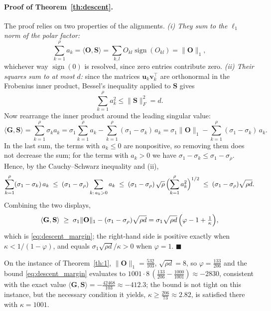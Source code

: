 \documentclass{article}
\begin{document}
\paragraph{Proof of Theorem~\ref{th:descent}.} The proof relies on two properties of the alignments.
\emph{(i) They sum to the $\ell_1$ norm of the polar factor:}
\begin{equation}
\sum_{k=1}^{\rho} a_k = \langle \mathbf{O}, \mathbf{S}\rangle = \sum_{k,l} O_{kl}\operatorname{sign}(O_{kl}) = \|\mathbf{O}\|_1,
\end{equation}
whichever way $\operatorname{sign}(0)$ is resolved, since zero entries contribute zero.
\emph{(ii) Their squares sum to at most $d$:} since the matrices $\mathbf{u}_k\mathbf{v}_k^\top$ are orthonormal in the Frobenius inner product, Bessel's inequality applied to $\mathbf{S}$ gives
\begin{equation}
\sum_{k=1}^{\rho} a_k^2 \le \|\mathbf{S}\|_F^2 = d .
\end{equation}
Now rearrange the inner product around the leading singular value:
\begin{equation}
\langle \mathbf{G}, \mathbf{S}\rangle = \sum_{k=1}^{\rho} \sigma_k a_k
= \sigma_1\sum_{k=1}^{\rho} a_k - \sum_{k=1}^{\rho} (\sigma_1 - \sigma_k)\, a_k
= \sigma_1\|\mathbf{O}\|_1 - \sum_{k=1}^{\rho} (\sigma_1 - \sigma_k)\, a_k .
\end{equation}
In the last sum, the terms with $a_k \le 0$ are nonpositive, so removing them does not decrease the sum; for the terms with $a_k > 0$ we have $\sigma_1 - \sigma_k \le \sigma_1 - \sigma_\rho$. Hence, by the Cauchy--Schwarz inequality and (ii),
\begin{equation}
\sum_{k=1}^{\rho} (\sigma_1 - \sigma_k)\, a_k
\;\le\; (\sigma_1 - \sigma_\rho) \sum_{k:\,a_k>0} a_k
\;\le\; (\sigma_1 - \sigma_\rho)\,\sqrt{\rho}\,\Bigl(\sum_{k=1}^{\rho} a_k^2\Bigr)^{1/2}
\;\le\; (\sigma_1 - \sigma_\rho)\sqrt{\rho d}.
\end{equation}
Combining the two displays,
\begin{equation}
\langle \mathbf{G}, \mathbf{S}\rangle \;\ge\; \sigma_1\|\mathbf{O}\|_1 - (\sigma_1-\sigma_\rho)\sqrt{\rho d}
= \sigma_1\sqrt{\rho d}\,\Bigl(\varphi - 1 + \tfrac{1}{\kappa}\Bigr),
\end{equation}
which is \eqref{eq:descent_margin}; the right-hand side is positive exactly when $\kappa < 1/(1-\varphi)$, and equals $\sigma_1\sqrt{\rho d}/\kappa > 0$ when $\varphi = 1$. $\blacksquare$

On the instance of Theorem~\ref{th:1}, $\|\mathbf{O}\|_1 = \tfrac{532}{103}$, $\sqrt{\rho d} = 8$, so $\varphi = \tfrac{133}{206}$ and the bound \eqref{eq:descent_margin} evaluates to $1001\cdot8\,(\tfrac{133}{206} - \tfrac{1000}{1001}) \approx -2830$, consistent with the exact value $\langle\mathbf{G},\mathbf{S}\rangle = -\tfrac{42468}{103} \approx -412.3$; the bound is not tight on this instance, but the necessary condition it yields, $\kappa \ge \tfrac{206}{73} \approx 2.82$, is satisfied there with $\kappa = 1001$.
\end{document}
